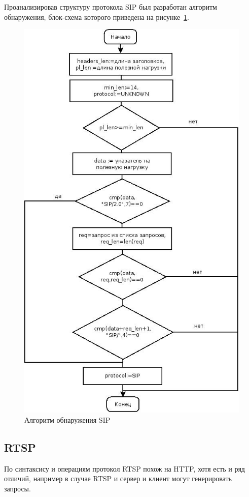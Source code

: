 Проанализировав структуру протокола SIP был разработан алгоритм обнаружения, блок-схема которого приведена на рисунке~\ref{pic:sip_alg}.
\begin{figure}
\centering
\includegraphics[scale=0.6]{pictures/sip_alg}
\caption{Алгоритм обнаружения SIP}
\label{pic:sip_alg}
\end{figure}

\subsection{RTSP}
По синтаксису и операциям протокол RTSP похож на HTTP, хотя есть и ряд отличий, например в случае RTSP и сервер и клиент могут генерировать запросы.

